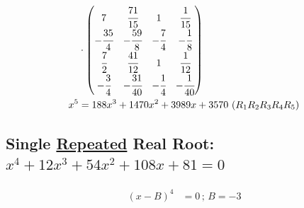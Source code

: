 \documentclass[12pt,a4paper]{article}
\begin{document}
\begin{align}
&\cdot \left( \begin{matrix}  7 & \cfrac{71}{15} & 1 & \cfrac{1}{15} \\
-\cfrac{35}{4} & -\cfrac{59}{8} & -\cfrac{7}{4} & -\cfrac{1}{8} \\
\cfrac{7}{2} & \cfrac{41}{12} & 1 & \cfrac{1}{12} \\
-\cfrac{3}{4} & - \cfrac{31}{40} & -\cfrac{1}{4} & -\cfrac{1}{40} \end{matrix} \right) \\
x^5 &= 188x^3 + 1470x^2 + 3989x + 3570\,\,(R_1R_2R_3R_4R_5)
\end{align}

\subsection{Single \href{}{Repeated} Real Root: $x^4 + 12 x^3 + 54 x^2 + 108 x + 81 = 0$}

\begin{align}
(x - B)^4 &= 0\,;\,B = - 3
\end{align}
\end{document}
